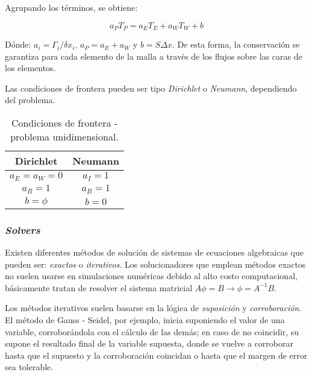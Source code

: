 \noindent
\justify

Agrupando los t\'erminos, se obtiene:

\begin{equation}
a_P T_P = a_E T_E + a_W T_W + b
\label{General1D}
\end{equation}

\noindent
\justify

D\'onde: $a_i = \Gamma _i / \delta x_i$, $a_P = a_E + a_W$ y $b = S \Delta x$. De esta forma, la conservaci\'on se garantiza para cada elemento de la malla a trav\'es de los flujos sobre las caras de los elementos.

\noindent
\justify

Las condiciones de frontera pueden ser tipo \textit{Dirichlet} o \textit{Neumann}, dependiendo del problema.

\begin{table}[h!]
\centering
\begin{tabular}{c|c}
\hline
\textbf{Dirichlet} & \textbf{Neumann} \\ \hline
$a_E = a_W = 0$ & $a_I = 1$ \\
$a_B = 1$ & $a_B = 1$ \\
$b = \phi$ & $b = 0$ \\ \hline
\end{tabular}
\caption{Condiciones de frontera - problema unidimensional.}
\end{table}

\subsubsection{\textit{Solvers}}

\noindent
\justify

Existen diferentes m\'etodos de soluci\'on de sistemas de ecuaciones algebraicas que pueden ser: \textit{exactos} o \textit{iterativos}. Los solucionadores que emplean m\'etodos exactos no suelen usarse en simulaciones num\'ericas debido al alto costo computacional, b\'asicamente tratan de resolver el sistema matricial $A \phi = B \rightarrow \phi = A^{-1} B$. 

\noindent
\justify

Los m\'etodos iterativos suelen basarse en la l\'ogica de \textit{suposici\'on} y \textit{corroboraci\'on}. El m\'etodo de Gauss - Seidel, por ejemplo, inicia suponiendo el valor de una variable, corrobor\'andola con el c\'alculo de las dem\'as; en caso de no coincidir, su supone el resultado final de la variable supuesta, donde se vuelve a corroborar hasta que el supuesto y la corroboraci\'on coincidan o hasta que el margen de error sea tolerable.

